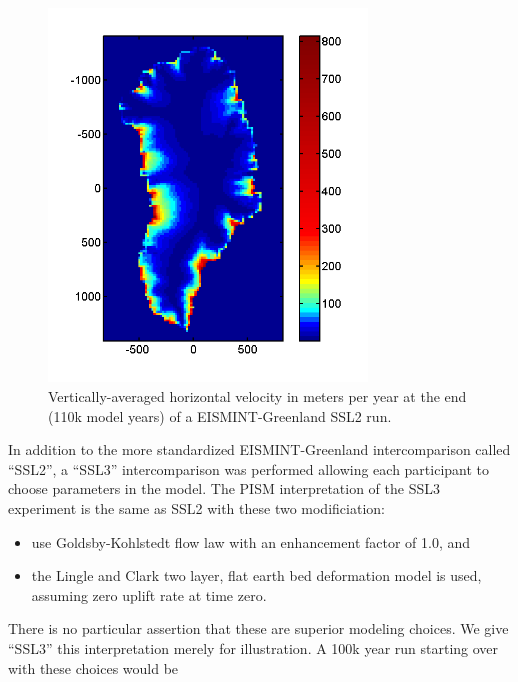\documentclass[11pt,final]{amsart}
\begin{document}
\begin{figure}[ht]
\includegraphics[height=3.9in,keepaspectratio=true]{figs/greencbar_SSL2}
\caption{Vertically-averaged horizontal velocity in meters per year at the end (110k model years) of a EISMINT-Greenland SSL2 run.}
\label{fig:ssl2cbar}
\end{figure}

In addition to the more standardized EISMINT-Greenland intercomparison called ``SSL2'', a ``SSL3'' intercomparison was performed allowing each participant to choose parameters in the model.  The PISM interpretation of the SSL3 experiment is the same as SSL2 with these two modificiation: \begin{itemize}
\item use Goldsby-Kohlstedt flow law \cite{GoldsbyKohlstedt} with an enhancement factor of 1.0, and
\item the Lingle and Clark \cite{BLKfastearth,LingleClark} two layer, flat earth bed deformation model is used, assuming zero uplift rate at time zero.
\end{itemize}
There is no particular assertion that these are superior modeling choices.  We give ``SSL3'' this interpretation merely for illustration.  A 100k year run starting over with these choices would be
\end{document}
